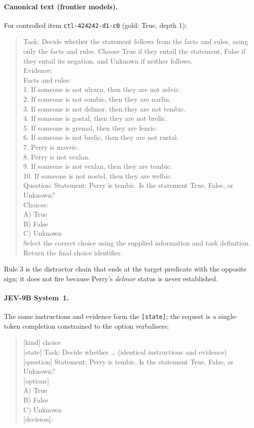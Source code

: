 \paragraph{Canonical text (frontier models).} For controlled item \texttt{ctl-424242-d1-c0} (gold: True, depth 1):
\begin{quote}\footnotesize\ttfamily
Task: Decide whether the statement follows from the facts and rules, using only the facts and rules. Choose True if they entail the statement, False if they entail its negation, and Unknown if neither follows.\\[3pt]
Evidence:\\
Facts and rules:\\
1. If someone is not ulvarn, then they are not zelvic.\\
2. If someone is not sombic, then they are narlin.\\
3. If someone is not delmor, then they are not tembic.\\
4. If someone is gostal, then they are not brelic.\\
5. If someone is gremal, then they are fenric.\\
6. If someone is not brelic, then they are not rustal.\\
7. Perry is mavric.\\
8. Perry is not vexlan.\\
9. If someone is not vexlan, then they are tembic.\\
10. If someone is not nostel, then they are welbic.\\[3pt]
Question: Statement: Perry is tembic. Is the statement True, False, or Unknown?\\[3pt]
Choices:\\
A) True\\
B) False\\
C) Unknown\\[3pt]
Select the correct choice using the supplied information and task definition. Return the final choice identifier.
\end{quote}
Rule 3 is the distractor chain that ends at the target predicate with the opposite sign; it does not fire because Perry's \textit{delmor} status is never established.

\paragraph{JEV-9B System~1.} The same instructions and evidence form the \texttt{[state]}; the request is a single-token completion constrained to the option verbalisers:
\begin{quote}\footnotesize\ttfamily
{[}kind{]} choice\\
{[}state{]} Task: Decide whether \ldots{} (identical instructions and evidence)\\
{[}question{]} Statement: Perry is tembic. Is the statement True, False, or Unknown?\\
{[}options{]}\\
A) True\\ B) False\\ C) Unknown\\
{[}decision{]}:
\end{quote}

